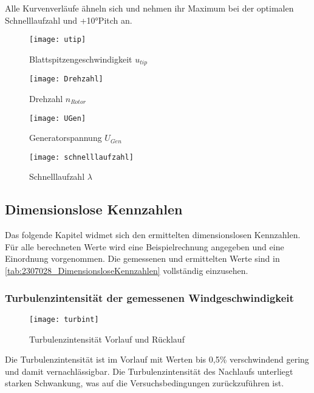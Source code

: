 Alle Kurvenverläufe ähneln sich und nehmen ihr Maximum bei der optimalen Schnelllaufzahl und +10°Pitch an.
\begin{figure}[H]
    \centering
        \begin{minipage}[t]{0.43\textwidth}
            \texttt{[image: utip]}
            \caption{Blattspitzengeschwindigkeit $u_{tip}$}
            \label{fig:utip}
        \end{minipage}
        \begin{minipage}[t]{0.43\textwidth}
            \texttt{[image: Drehzahl]}
            \caption{Drehzahl $n_{Rotor}$}
            \label{fig:n_rotor}
        \end{minipage}
        \begin{minipage}[b]{0.43\textwidth}
            \texttt{[image: UGen]}
            \caption{Generatorspannung $U_{Gen}$}
            \label{fig:UGen}
        \end{minipage}
        \begin{minipage}[b]{0.43\textwidth}
            \texttt{[image: schnelllaufzahl]}
            \caption{Schnelllaufzahl $\lambda$}
            \label{fig:lambda}
        \end{minipage}
    \end{figure}  

\subsection{Dimensionslose Kennzahlen}
Das folgende Kapitel widmet sich den ermittelten dimensionslosen Kennzahlen.
Für alle berechneten Werte wird eine Beispielrechnung angegeben und eine Einordnung vorgenommen.
Die gemessenen und ermittelten Werte sind in \autoref{tab:2307028_DimensionsloseKennzahlen} vollständig einzusehen.
\subsubsection*{Turbulenzintensität der gemessenen Windgeschwindigkeit}
\begin{figure}[H]
    \centering
    \texttt{[image: turbint]}
    \caption{Turbulenzintensität Vorlauf und Rücklauf}
    \label{fig:Turbulenzintensität}
\end{figure}
Die Turbulenzintensität ist im Vorlauf mit Werten bis 0,5\% verschwindend gering und damit vernachlässigbar. Die Turbulenzintensität des Nachlaufs unterliegt starken Schwankung, was auf die Versuchsbedingungen zurückzuführen ist.

